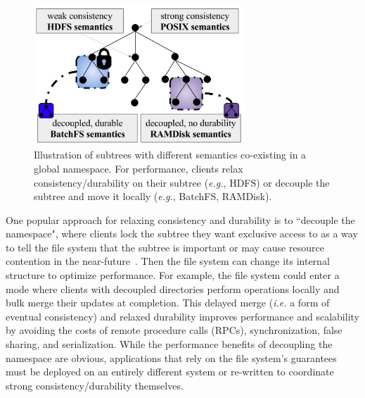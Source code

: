 \begin{figure}[tb] \centering
\includegraphics[width=0.7\textwidth]{./chapters/cudele/figures/subtree-policies1.png}
\caption{Illustration of subtrees with different semantics co-existing in a
global namespace.  For performance, clients  relax consistency/durability on their
subtree ({\it e.g.}, HDFS) or decouple the subtree and move it locally ({\it e.g.}, BatchFS, RAMDisk).
}\label{fig:subtree-policies} \end{figure}

One popular approach for relaxing consistency and durability is to ``decouple
the namespace", where clients lock the subtree they want exclusive access to as
a way to tell the file system that the subtree is important or may cause
resource contention in the near-future~\cite{grider:pdsw2015-marfs,
zheng:pdsw2015-deltafs, zheng:pdsw2014-batchfs, ren:sc2014-indexfs,
bent:slides-twotiers}. Then the file system can change its internal structure
to optimize performance. For example, the file system could enter a mode where
clients with decoupled directories perform operations locally and bulk merge their
updates at completion. This delayed merge ({\it i.e.} a form of eventual
consistency) and relaxed durability improves performance and scalability by
avoiding the costs of remote procedure calls (RPCs), synchronization, false
sharing, and serialization.  While the performance benefits of decoupling the
namespace are obvious, applications that rely on the file system's guarantees
must be deployed on an entirely different system or re-written to coordinate
strong consistency/durability themselves. 

